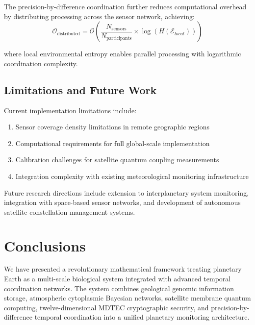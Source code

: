 \documentclass[12pt,a4paper]{article}
\begin{document}
The precision-by-difference coordination further reduces computational overhead by distributing processing across the sensor network, achieving:
\begin{equation}
\mathcal{O}_{\text{distributed}} = \mathcal{O}\left(\frac{N_{\text{sensors}}}{N_{\text{participants}}} \times \log(H(\mathcal{E}_{local}))\right)
\end{equation}

where local environmental entropy enables parallel processing with logarithmic coordination complexity.

\subsection{Limitations and Future Work}

Current implementation limitations include:

\begin{enumerate}
\item Sensor coverage density limitations in remote geographic regions
\item Computational requirements for full global-scale implementation
\item Calibration challenges for satellite quantum coupling measurements
\item Integration complexity with existing meteorological monitoring infrastructure
\end{enumerate}

Future research directions include extension to interplanetary system monitoring, integration with space-based sensor networks, and development of autonomous satellite constellation management systems.

\section{Conclusions}

We have presented a revolutionary mathematical framework treating planetary Earth as a multi-scale biological system integrated with advanced temporal coordination networks. The system combines geological genomic information storage, atmospheric cytoplasmic Bayesian networks, satellite membrane quantum computing, twelve-dimensional MDTEC cryptographic security, and precision-by-difference temporal coordination into a unified planetary monitoring architecture.
\end{document}
